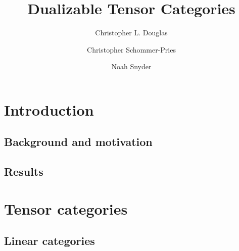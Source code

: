 \documentclass{amsart}
\begin{document}
\title{Dualizable Tensor Categories}

\begin{abstract}

\end{abstract}
	
\author{Christopher L. Douglas}
\address{Department of Mathematics, University of California, Berkeley, CA 94720, USA}
	
\author{Christopher Schommer-Pries}
\address{Department of Mathematics \\
	Harvard University\\
	1 Oxford St.\\
	Cambridge, MA 02138} %

\author{Noah Snyder}
\address{}
\email{}

\maketitle	
\tableofcontents

\section{Introduction}

\subsection{Background and motivation}

\subsection{Results}

\section{Tensor categories}





\subsection{Linear categories}
\end{document}
